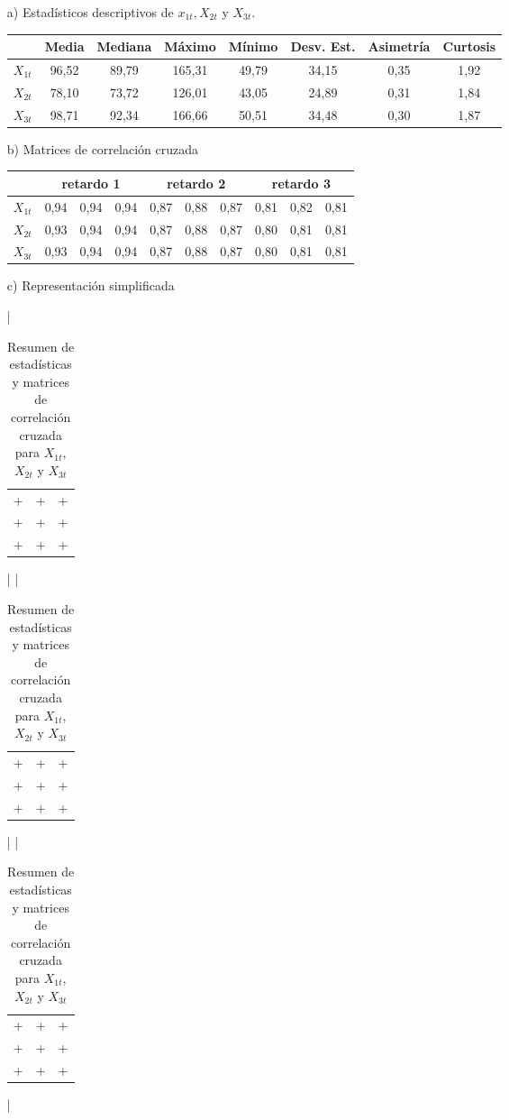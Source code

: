 \begin{itemize}
      \item[a)] Estadísticos descriptivos de $x_{1t}, X_{2t}$ y $X_{3t}$.
\begin{table}[H]
\centering
\begin{tabular}{cccccccc}\hline
~ & Media & Mediana & M\'{a}ximo & M\'{i}nimo & Desv. Est.& Asimetr\'{i}a & Curtosis\\ \hline
$X_{1t}$ & 96,52 & 89,79 & 165,31 & 49,79 & 34,15 & 0,35 & 1,92 \\ 
$X_{2t}$ & 78,10 & 73,72 & 126,01 & 43,05 & 24,89 & 0,31 & 1,84 \\ 
$X_{3t}$ & 98,71 & 92,34 & 166,66 & 50,51 & 34,48 & 0,30 & 1,87 \\ \hline
\end{tabular}
\end{table}

      \item[b)] Matrices de correlación cruzada
\begin{table}[H]
\centering
\begin{tabular}{cccccccccc}\hline
~& \multicolumn{3}{c}{retardo 1} & \multicolumn{3}{c}{retardo 2} & \multicolumn{3}{c}{retardo 3} \\ \hline 
$X_{1t}$ & 0,94 & 0,94 & 0,94 & 0,87 & 0,88 & 0,87 & 0,81 & 0,82 & 0,81 \\
$X_{2t}$ & 0,93 & 0,94 & 0,94 & 0,87 & 0,88 & 0,87 & 0,80 & 0,81 & 0,81 \\
$X_{3t}$ & 0,93 & 0,94 & 0,94 & 0,87 & 0,88 & 0,87 & 0,80 & 0,81 & 0,81 \\ \hline
\end{tabular}
\end{table}

      \item[c)] Representación simplificada

\begin{table}[H]
\centering

\left|\begin{tabular}{ccc}
+ & + & + \\
+ & + & + \\
+ & + & + \\
\end{tabular} \right| \quad \left|
\begin{tabular}{ccc}
+ & + & + \\
+ & + & + \\
+ & + & + \\
\end{tabular} \right| \quad \left|
\begin{tabular}{ccc}
+ & + & + \\
+ & + & + \\
+ & + & + \\
\end{tabular}\right|
\caption{Resumen de estadísticas y matrices de correlación cruzada para $X_{1t}$, $X_{2t}$ y $X_{3t}$}
\label{tab13}
\end{table}
\end{itemize}

